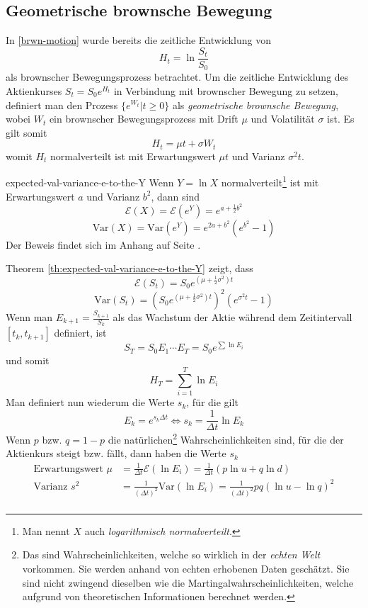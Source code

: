 \documentclass[11pt]{report} %
\begin{document}
\subsection{Geometrische brownsche Bewegung}
In \ref{brwn-motion} wurde bereits die zeitliche Entwicklung von $$H_t=\ln{\frac{S_t}{S_0}}$$ als brownscher Bewegungsprozess betrachtet. Um die zeitliche Entwicklung des Aktienkurses $S_t=S_0e^{H_t}$ in Verbindung mit brownscher Bewegung zu setzen, definiert man den Prozess $\{e^{W_t}|t\geq0\}$ als \textit{geometrische brownsche Bewegung}, wobei $W_t$ ein brownscher Bewegungsprozess mit Drift $\mu$ und Volatilität $\sigma$ ist. Es gilt somit $$H_t=\mu t + \sigma W_t$$ womit $H_t$ normalverteilt ist mit Erwartungswert $\mu t$ und Varianz $\sigma^2t$. 
\begin{Theorem}{}{expected-val-variance-e-to-the-Y}
    Wenn $Y=\ln{X}$ normalverteilt\footnote{Man nennt $X$ auch \textit{logarithmisch normalverteilt}.} ist mit Erwartungswert $a$ und Varianz $b^2$, dann sind
    $$\mathcal{E}(X)=\mathcal{E}(e^Y)=e^{a+\frac{1}{2}b^2}$$
    $$\text{Var}(X)=\text{Var}(e^Y)=e^{2a+b^2}(e^{b^2}-1)$$
    Der Beweis findet sich im Anhang auf Seite \pageref{proof:lognorm-props}.
\end{Theorem}
Theorem \ref{th:expected-val-variance-e-to-the-Y} zeigt, dass
$$\mathcal{E}(S_t)=S_0e^{(\mu+\frac{1}{2}\sigma^2)t}$$
$$\text{Var}(S_t)=(S_0e^{(\mu+\frac{1}{2}\sigma^2)t})^2(e^{\sigma^2t}-1)$$
Wenn man $E_{k+1}=\frac{S_{k+1}}{S_k}$ als das Wachstum der Aktie während dem Zeitintervall $[t_k, t_{k+1}]$ definiert, ist $$S_T=S_0E_1\cdots E_T=S_0e^{\sum\ln{E_i}}$$ und somit
$$H_T=\sum_{i=1}^{T}\ln{E_i}$$
Man definiert nun wiederum die Werte $s_{k}$, für die gilt $$E_{k}=e^{s_{k}\Delta t} \Longleftrightarrow  s_{k}=\frac{1}{\Delta t}\ln{E_{k}}$$ Wenn $p$ bzw. $q=1-p$ die natürlichen\footnote{Das sind Wahrscheinlichkeiten, welche so wirklich in der \textit{echten Welt} vorkommen. Sie werden anhand von echten erhobenen Daten geschätzt. Sie sind nicht zwingend dieselben wie die Martingalwahrscheinlichkeiten, welche aufgrund von theoretischen Informationen berechnet werden.} Wahrscheinlichkeiten sind, für die der Aktienkurs steigt bzw. fällt, dann haben die Werte $s_k$\label{nat-drift-volat}
\begin{align*}
    \text{Erwartungswert } \mu&=\frac{1}{\Delta t}\mathcal{E}(\ln{E_i})=\frac{1}{\Delta t}(p\ln{u}+q\ln{d})\\
    \text{Varianz } s^2&=\frac{1}{(\Delta t)^2}\text{Var}(\ln{E_i})=\frac{1}{(\Delta t)^2}pq(\ln{u}-\ln{q})^2\\
\end{align*}
\end{document}
